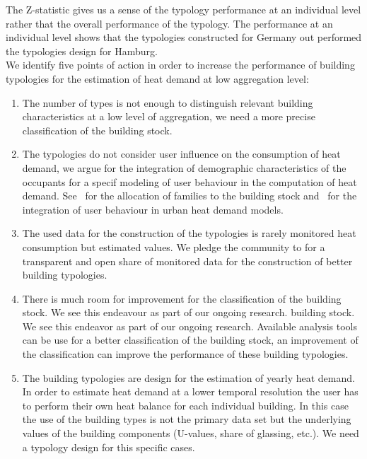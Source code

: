 The Z-statistic gives us a sense of the typology performance at an individual
level rather that the overall performance of the typology. The performance at
an individual level shows that the typologies constructed for Germany out
performed the typologies design for Hamburg.\\

We identify five points of action in order to increase the performance of
building typologies for the estimation of heat demand at low aggregation level:

\begin{enumerate}
    \item The number of types is not enough to distinguish relevant
        building characteristics at a low level of aggregation, we need a more
        precise classification of the building stock.
    \item The typologies do not consider user influence on the consumption of
        heat demand, we argue for the integration of demographic
        characteristics of the occupants for a specif modeling of user
        behaviour in the computation of heat demand.
        See~\cite{Munoz.2014b} for the allocation of families to
        the building stock and~\cite{Munoz.2014c} for the integration of
        user behaviour in urban heat demand models.
    \item The used data for the construction of the typologies is rarely
        monitored heat consumption but estimated values. We pledge the
        community to for a transparent and open share of monitored data for the
        construction of better building typologies.
    \item There is much room for improvement for the classification of the
        building stock. We see this endeavour as part of our ongoing research.
        building stock. We see this endeavor as part of our ongoing research.
        Available analysis tools can be use for a better classification of the
        building stock, an improvement of the classification can improve the
        performance of these building typologies.
    \item The building typologies are design for the estimation of yearly heat
        demand. In order to estimate heat demand at a lower temporal resolution
        the user has to perform their own heat balance for each individual
        building. In this case the use of the building types is not the
        primary data set but the underlying values of the building components
        (U-values, share of glassing, etc.). We need a typology design for this
        specific cases.
\end{enumerate}

